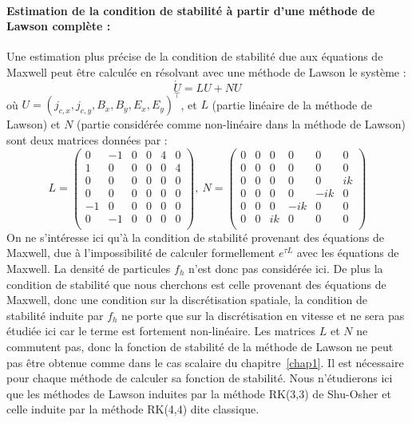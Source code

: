 \paragraph{Estimation de la condition de stabilité à partir d'une méthode de Lawson complète :\\}
Une estimation plus précise de la condition de stabilité due aux équations de Maxwell peut être calculée en résolvant avec une méthode de Lawson le système :
$$
  \dot{U} = LU + NU
$$
où $U = (j_{c,x},j_{c,y},B_x,B_y,E_x,E_y)^\top$, et $L$ (partie linéaire de la méthode de Lawson) et $N$ (partie considérée comme non-linéaire dans la méthode de Lawson) sont deux matrices données par :
$$  L = \begin{pmatrix}
    0 & -1 & 0 & 0 & 4 & 0 \\
    1 &  0 & 0 & 0 & 0 & 4 \\
    0 &  0 & 0 & 0 & 0 & 0 \\
    0 &  0 & 0 & 0 & 0 & 0 \\
   -1 &  0 & 0 & 0 & 0 & 0 \\
    0 & -1 & 0 & 0 & 0 & 0 \\
  \end{pmatrix},
  \ 
  N = \begin{pmatrix}
    0 & 0 & 0  &  0  &  0  & 0  \\
    0 & 0 & 0  &  0  &  0  & 0  \\
    0 & 0 & 0  &  0  &  0  & ik \\
    0 & 0 & 0  &  0  & -ik & 0  \\
    0 & 0 & 0  & -ik &  0  & 0  \\
    0 & 0 & ik &  0  &  0  & 0  \\
  \end{pmatrix}
$$
On ne s'intéresse ici qu'à la condition de stabilité provenant des équations de Maxwell, due à l'impossibilité de calculer formellement $e^{\tau L}$ avec les équations de Maxwell. La densité de particules $f_h$ n'est donc pas considérée ici. De plus la condition de stabilité que nous cherchons est celle provenant des équations de Maxwell, donc une condition sur la discrétisation spatiale, la condition de stabilité induite par $f_h$ ne porte que sur la discrétisation en vitesse et ne sera pas étudiée ici car le terme est fortement non-linéaire. Les matrices $L$ et $N$ ne commutent pas, donc la fonction de stabilité de la méthode de Lawson ne peut pas être obtenue comme dans le cas scalaire du chapitre~\ref{chap1}. Il est nécessaire pour chaque méthode de calculer sa fonction de stabilité. Nous n'étudierons ici que les méthodes de Lawson induites par la méthode RK(3,3) de Shu-Osher et celle induite par la méthode RK(4,4) dite classique.

